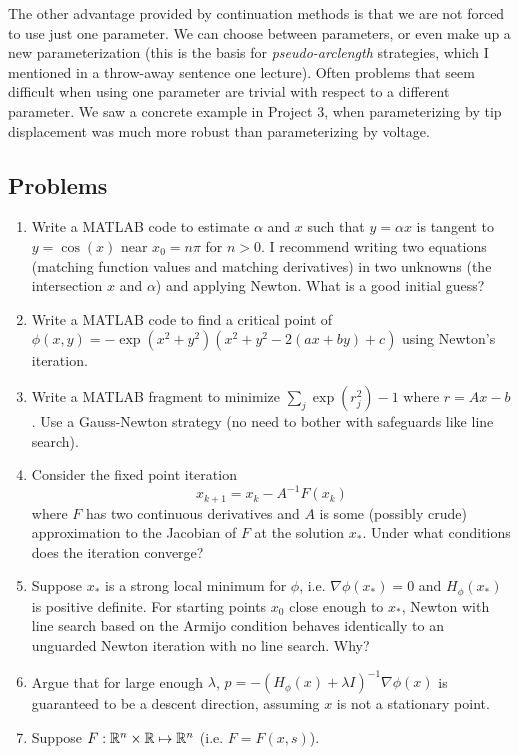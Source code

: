 \documentclass[12pt, leqno]{article}
\begin{document}
The other advantage provided by continuation methods is that we are
not forced to use just one parameter.  We can choose between
parameters, or even make up a new parameterization (this is the basis
for {\em pseudo-arclength} strategies, which I mentioned in a
throw-away sentence one lecture).  Often problems that seem difficult
when using one parameter are trivial with respect to a different
parameter.  We saw a concrete example in Project 3, when
parameterizing by tip displacement was much more robust than
parameterizing by voltage.

\subsection{Problems}

\begin{enumerate}
\item
  Write a MATLAB code to estimate $\alpha$ and $x$ such that
  $y = \alpha x$ is tangent to $y = \cos(x)$ near $x_0 = n \pi$
  for $n > 0$.  I recommend writing two equations (matching function
  values and matching derivatives) in two unknowns (the intersection
  $x$ and $\alpha$) and applying Newton.  What is a good initial guess?
\item
  Write a MATLAB code to find a critical point of
  $\phi(x,y) = -\exp(x^2+y^2) (x^2 + y^2 - 2(ax + by) + c)$
  using Newton's iteration.
\item
  Write a MATLAB fragment to minimize $\sum_j \exp(r_j^2)-1$ where
  $r = Ax-b$.  Use a Gauss-Newton strategy (no need to bother
  with safeguards like line search).
\item
  Consider the fixed point iteration
  \[
    x_{k+1} = x_k - A^{-1} F(x_k)
  \]
  where $F$ has two continuous derivatives and $A$ is some (possibly
  crude) approximation to the Jacobian of $F$ at the solution $x_*$.
  Under what conditions does the iteration converge?
\item
  Suppose $x_*$ is a strong local minimum for $\phi$, i.e. $\nabla
  \phi(x_*) = 0$ and $H_\phi(x_*)$ is positive definite.  For starting
  points $x_0$ close enough to $x_*$, Newton with line search based
  on the Armijo condition behaves identically to an unguarded
  Newton iteration with no line search.  Why?
\item
  Argue that for large enough $\lambda$,
  $p = -(H_{\phi}(x) + \lambda I)^{-1} \nabla \phi(x)$ is guaranteed
  to be a descent direction, assuming $x$ is not a stationary point.
\item
  Suppose $F : \mathbb{R}^n \times \mathbb{R} \mapsto \mathbb{R}^n$ (i.e. $F = F(x,s)$).

\end{enumerate}
\end{document}
